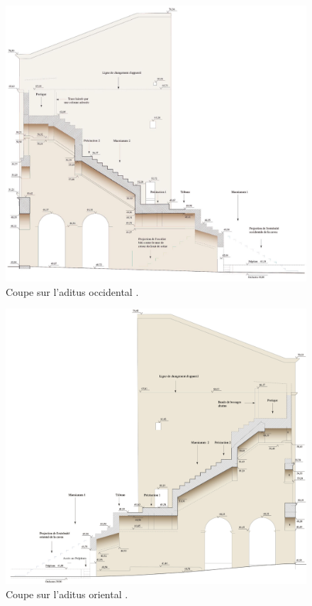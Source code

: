 \begin{figure}[!h]
		\includegraphics[width=\linewidth]{images/aditusOccidental}
		\caption[Coupe sur l'\gls{aditus} occidental]{Coupe sur l'\gls{aditus} occidental \cite[Pl. XLVIII]{orangePl}.}
		\label{aditusOccidental}	
\end{figure}

\begin{figure}[!h]
		\includegraphics[width=\linewidth]{images/aditusOriental}
		\caption[Coupe sur l'\gls{aditus} oriental.]{Coupe sur l'\gls{aditus} oriental \cite[Pl. XLIX]{orangePl}.}
		\label{aditusOriental}
\end{figure}

